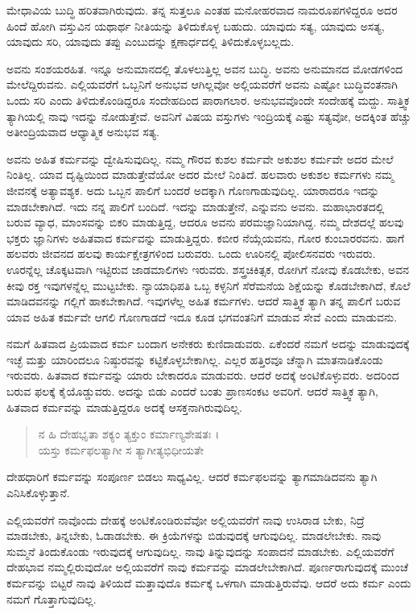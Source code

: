 ಮೇಧಾವಿಯ ಬುದ್ಧಿ ಹರಿತವಾಗಿರುವುದು. ತನ್ನ ಸುತ್ತಲೂ ಎಂತಹ ಮನೋಹರವಾದ ನಾಮರೂಪಗಳಿದ್ದರೂ ಅದರ ಹಿಂದೆ ಹೋಗಿ ವಸ್ತುವಿನ ಯಥಾರ್ಥ ನೀತಿಯನ್ನು ತಿಳಿದುಕೊಳ್ಳ ಬಹುದು. ಯಾವುದು ಸತ್ಯ, ಯಾವುದು ಅಸತ್ಯ, ಯಾವುದು ಸರಿ, ಯಾವುದು ತಪ್ಪು ಎಂಬುದನ್ನು ಕ್ಷಣಾರ್ಧದಲ್ಲಿ ತಿಳಿದುಕೊಳ್ಳಬಲ್ಲದು.

ಅವನು ಸಂಶಯರಹಿತ. ಇನ್ನೂ ಅನುಮಾನದಲ್ಲಿ ತೊಳಲುತ್ತಿಲ್ಲ ಅವನ ಬುದ್ಧಿ. ಅವನು ಅನುಮಾನದ ಮೋಡಗಳಿಂದ ಮೇಲೆದ್ದಿರುವನು. ಎಲ್ಲಿಯವರೆಗೆ ಒಬ್ಬನಿಗೆ ಅನುಭವ ಆಗಿಲ್ಲವೋ ಅಲ್ಲಿಯವರೆಗೆ ಅವನು ಎಷ್ಟೋ ಬುದ್ಧಿವಂತನಾಗಿ ಒಂದು ಸರಿ ಎಂದು ತಿಳಿದುಕೊಂಡಿದ್ದರೂ ಸಂದೇಹದಿಂದ ಪಾರಾಗಲಾರ. ಅನುಭವವೊಂದೇ ಸಂದೇಹಕ್ಕೆ ಮದ್ದು. ಸಾತ್ತ್ವಿಕ ತ್ಯಾಗಿಯಲ್ಲಿ ನಾವು ಇದನ್ನು ನೋಡುತ್ತೇವೆ. ಅವನಿಗೆ ವಿಷಯ ವಸ್ತುಗಳು ಇಂದ್ರಿಯಕ್ಕೆ ಎಷ್ಟು ಸತ್ಯವೋ, ಅದಕ್ಕಿಂತ ಹೆಚ್ಚು ಅತೀಂದ್ರಿಯವಾದ ಆಧ್ಯಾತ್ಮಿಕ ಅನುಭವ ಸತ್ಯ.

ಅವನು ಅಹಿತ ಕರ್ಮವನ್ನು ದ್ವೇಷಿಸುವುದಿಲ್ಲ. ನಮ್ಮ ಗೌರವ ಕುಶಲ ಕರ್ಮವೇ ಅಕುಶಲ ಕರ್ಮವೇ ಅದರ ಮೇಲೆ ನಿಂತಿಲ್ಲ. ಯಾವ ದೃಷ್ಟಿಯಿಂದ ಮಾಡುತ್ತೇವೆಯೋ ಅದರ ಮೇಲೆ ನಿಂತಿದೆ. ಹಲವಾರು ಅಕುಶಲ ಕರ್ಮಗಳು ನಮ್ಮ ಜೀವನಕ್ಕೆ ಅತ್ಯಾವಶ್ಯಕ. ಅದು ಒಬ್ಬನ ಪಾಲಿಗೆ ಬಂದರೆ ಅದಕ್ಕಾಗಿ ಗೊಣಗಾಡುವುದಿಲ್ಲ. ಯಾರಾದರೂ ಇದನ್ನು ಮಾಡಬೇಕಾಗಿದೆ. ಇದು ನನ್ನ ಪಾಲಿಗೆ ಬಂದಿದೆ. ಇದನ್ನು ಮಾಡುತ್ತೇನೆ, ಎನ್ನುವನು ಅವನು. ಮಹಾಭಾರತದಲ್ಲಿ ಬರುವ ವ್ಯಾಧ, ಮಾಂಸವನ್ನು ಬಿಕರಿ ಮಾಡುತ್ತಿದ್ದ, ಆದರೂ ಅವನು ಪರಮಜ್ಞಾನಿಯಾಗಿದ್ದ. ನಮ್ಮ ದೇಶದಲ್ಲೆ ಹಲವು ಭಕ್ತರು ಜ್ಞಾನಿಗಳು ಅಹಿತವಾದ ಕರ್ಮವನ್ನು ಮಾಡುತ್ತಿದ್ದರು. ಕಬೀರ ನೆಯ್ಗೆಯವನು, ಗೋರ ಕುಂಬಾರರವನು. ಹಾಗೆ ಹಲವರು ಜೀವನದ ಹಲವು ಕಾರ್ಯಕ್ಷೇತ್ರಗಳಿಂದ ಬರುವರು. ಒಂದು ಊರಿನಲ್ಲಿ ಪೋಲಿಸನವರು ಇರುವರು. ಊರನ್ನೆಲ್ಲ ಚೊಕ್ಕಟವಾಗಿ ಇಟ್ಟಿರುವ ಜಾಡಮಾಲಿಗಳು ಇರುವರು. ಶಸ್ತ್ರಚಿಕಿತ್ಸಕ, ರೋಗಿಗೆ ನೋವು ಕೊಡಬೇಕು, ಅವನ ಕೀವು ರಕ್ತ ಇವುಗಳನ್ನೆಲ್ಲ ಮುಟ್ಟಬೇಕು. ನ್ಯಾಯಾಧಿಪತಿ ಒಬ್ಬ ಕಳ್ಳನಿಗೆ ಸೆರೆಮನೆಯ ಶಿಕ್ಷೆಯನ್ನು ಕೊಡಬೇಕಾಗಿದೆ, ಕೊಲೆ ಮಾಡಿದವನನ್ನು ಗಲ್ಲಿಗೆ ಹಾಕಬೇಕಾಗಿದೆ. ಇವುಗಳೆಲ್ಲ ಅಹಿತ ಕರ್ಮಗಳು. ಆದರೆ ಸಾತ್ತ್ವಿಕ ತ್ಯಾಗಿ ತನ್ನ ಪಾಲಿಗೆ ಬರುವ ಯಾವ ಅಹಿತ ಕರ್ಮವೇ ಆಗಲಿ ಗೊಣಗಾಡದೆ ಇದೂ ಕೂಡ ಭಗವಂತನಿಗೆ ಮಾಡುವ ಸೇವೆ ಎಂದು ಮಾಡುವನು.

ನಮಗೆ ಹಿತವಾದ ಪ್ರಿಯವಾದ ಕರ್ಮ ಬಂದಾಗ ಅನೇಕರು ಕುಣಿದಾಡುವರು. ಏಕೆಂದರೆ ನಮಗೆ ಅದನ್ನು ಮಾಡುವುದಕ್ಕೆ ಇಚ್ಛೆ ಮತ್ತು ಯಾರಿಂದಲೂ ನಿಷ್ಠುರವನ್ನು ಕಟ್ಟಿಕೊಳ್ಳಬೇಕಾಗಿಲ್ಲ. ಎಲ್ಲರ ಹತ್ತಿರವೂ ಚೆನ್ನಾಗಿ ಮಾತನಾಡಿಕೊಂಡು ಇರುವರು. ಹಿತವಾದ ಕರ್ಮವನ್ನು ಯಾರು ಬೇಕಾದರೂ ಮಾಡುವರು. ಆದರೆ ಅದಕ್ಕೆ ಅಂಟಿಕೊಳ್ಳುವರು. ಅದರಿಂದ ಬರುವ ಫಲಕ್ಕೆ ಕೈಯೊಡ್ಡುವರು. ಅದನ್ನು ಬಿಡು ಎಂದರೆ ಬಂತು ಪ್ರಾಣಸಂಕಟ ಅವರಿಗೆ. ಆದರೆ ಸಾತ್ತ್ವಿಕ ತ್ಯಾಗಿ, ಹಿತವಾದ ಕರ್ಮವನ್ನು ಮಾಡುತ್ತಿದ್ದರೂ ಅದಕ್ಕೆ ಆಸಕ್ತನಾಗಿರುವುದಿಲ್ಲ.

\begin{verse}
ನ ಹಿ ದೇಹಭೃತಾ ಶಕ್ಯಂ ತ್ಯಕ್ತುಂ ಕರ್ಮಾಣ್ಯಶೇಷತಃ ।\\ಯಸ್ತು ಕರ್ಮಫಲತ್ಯಾಗೀ ಸ ತ್ಯಾಗೀತ್ಯಭಿಧೀಯತೇ 
\end{verse}

{\small ದೇಹಧಾರಿಗೆ ಕರ್ಮವನ್ನು ಸಂಪೂರ್ಣ ಬಿಡಲು ಸಾಧ್ಯವಿಲ್ಲ. ಆದರೆ ಕರ್ಮಫಲವನ್ನು ತ್ಯಾಗಮಾಡಿದವನು ತ್ಯಾಗಿ ಎನಿಸಿಕೊಳ್ಳುತ್ತಾನೆ.}

ಎಲ್ಲಿಯವರೆಗೆ ನಾವೊಂದು ದೇಹಕ್ಕೆ ಅಂಟಿಕೊಂಡಿರುವೆವೋ ಅಲ್ಲಿಯವರೆಗೆ ನಾವು ಉಸಿರಾಡ ಬೇಕು, ನಿದ್ರೆ ಮಾಡಬೇಕು, ತಿನ್ನಬೇಕು, ಓಡಾಡಬೇಕು. ಈ ಕ್ರಿಯೆಗಳನ್ನು ಬಿಡುವುದಕ್ಕೆ ಆಗುವುದಿಲ್ಲ. ಮಾಡಲೇಬೇಕು. ನಾವು ಸುಮ್ಮನೆ ತಿಂದುಕೊಂಡು ಇರುವುದಕ್ಕೆ ಆಗುವುದಿಲ್ಲ. ನಾವು ತಿನ್ನುವುದನ್ನು ಸಂಪಾದನೆ ಮಾಡಬೇಕು. ಎಲ್ಲಿಯವರೆಗೆ ದೇಹಭಾವ ನಮ್ಮಲ್ಲಿರುವುದೋ ಅಲ್ಲಿಯವರೆಗೆ ನಾವು ಕರ್ಮವನ್ನು ಮಾಡಲೇಬೇಕಾಗಿದೆ. ಪೂರ್ಣರಾಗುವುದಕ್ಕೆ ಮುಂಚೆ ಕರ್ಮವನ್ನು ಬಿಟ್ಟರೆ ನಾವು ತಿಳಿಯದೆ ಮತ್ತಾವುದೊ ಕರ್ಮಕ್ಕೆ ಒಳಗಾಗಿ ಮಾಡುತ್ತಿರುವೆವು. ಆದರೆ ಅದು ಕರ್ಮ ಎಂದು ನಮಗೆ ಗೊತ್ತಾಗುವುದಿಲ್ಲ.

